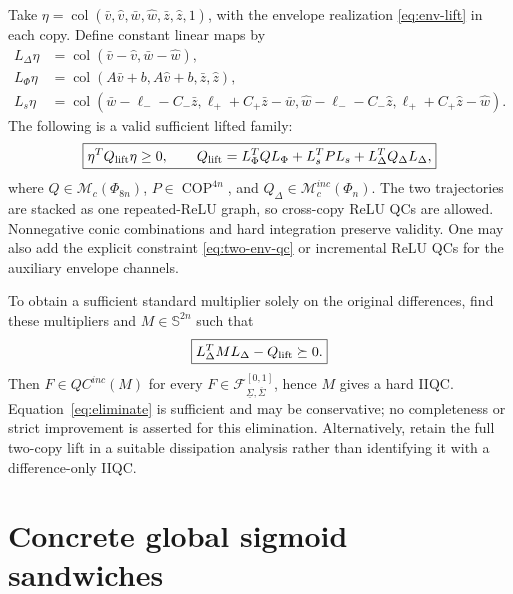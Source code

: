 \documentclass[10pt,a4paper]{article}
\theoremstyle{definition}
\theoremstyle{remark}
\newcommand{\Ss}{\mathbb S}
\newcommand{\COP}{\operatorname{COP}}
\newcommand{\col}{\operatorname{col}}
\newcommand{\mc}{\mathcal M_c}
\newcommand{\Fenv}{\mathcal F_{\underline\Sigma,\overline\Sigma}}
\begin{document}
Take $\eta=\col(\bar v,\hat v,\bar w,\hat w,\bar z,\hat z,1)$, with the envelope realization \eqref{eq:env-lift} in each copy. Define constant linear maps by
\begin{align*}
 L_\Delta\eta&=\col(\bar v-\hat v,\bar w-\hat w),\\
 L_\Phi\eta&=\col(A\bar v+b,A\hat v+b,\bar z,\hat z),\\
 L_s\eta&=\col(\bar w-\ell_--C_-\bar z,\ell_++C_+\bar z-\bar w,
                 \hat w-\ell_--C_-\hat z,\ell_++C_+\hat z-\hat w).
\end{align*}
The following is a valid sufficient lifted family:
\begin{equation}\label{eq:subclass-lift}
 \boxed{\eta^TQ_{\rm lift}\eta\ge0,\qquad
 Q_{\rm lift}=L_\Phi^TQL_\Phi+L_s^TPL_s+L_\Delta^TQ_\Delta L_\Delta,}
\end{equation}
where $Q\in\mc(\Phi_{8n})$, $P\in\COP^{4n}$, and $Q_\Delta\in\mc^{inc}(\Phi_n)$. The two trajectories are stacked as one repeated-ReLU graph, so cross-copy ReLU QCs are allowed. Nonnegative conic combinations and hard integration preserve validity. One may also add the explicit constraint \eqref{eq:two-env-qc} or incremental ReLU QCs for the auxiliary envelope channels.

To obtain a sufficient standard multiplier solely on the original differences, find these multipliers and $M\in\Ss^{2n}$ such that
\begin{equation}\label{eq:eliminate}
 \boxed{L_\Delta^TML_\Delta-Q_{\rm lift}\succeq0.}
\end{equation}
Then $F\in QC^{inc}(M)$ for every $F\in\Fenv^{[0,1]}$, hence $M$ gives a hard IIQC. Equation~\eqref{eq:eliminate} is sufficient and may be conservative; no completeness or strict improvement is asserted for this elimination. Alternatively, retain the full two-copy lift in a suitable dissipation analysis rather than identifying it with a difference-only IIQC.

\section{Concrete global sigmoid sandwiches}
\end{document}
